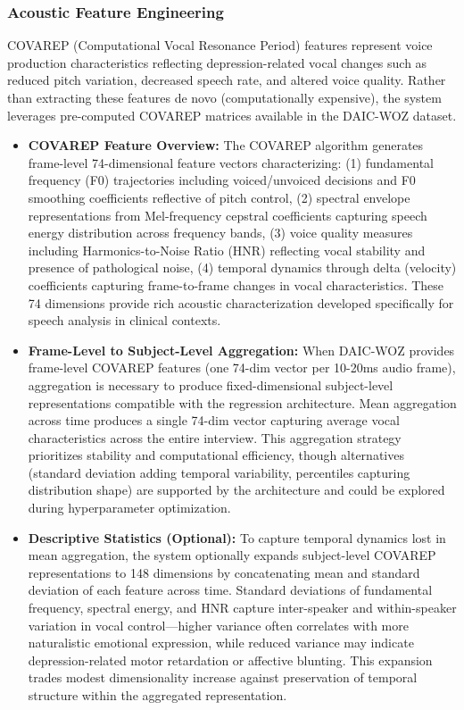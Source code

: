 \documentclass[12pt]{article}
\begin{document}
	\subsubsection{Acoustic Feature Engineering}

	COVAREP (Computational Vocal Resonance Period) features represent voice production characteristics reflecting depression-related vocal changes such as reduced pitch variation, decreased speech rate, and altered voice quality. Rather than extracting these features de novo (computationally expensive), the system leverages pre-computed COVAREP matrices available in the DAIC-WOZ dataset.

	\begin{itemize}
		\item \textbf{COVAREP Feature Overview:} The COVAREP algorithm generates frame-level 74-dimensional feature vectors characterizing: (1) fundamental frequency (F0) trajectories including voiced/unvoiced decisions and F0 smoothing coefficients reflective of pitch control, (2) spectral envelope representations from Mel-frequency cepstral coefficients capturing speech energy distribution across frequency bands, (3) voice quality measures including Harmonics-to-Noise Ratio (HNR) reflecting vocal stability and presence of pathological noise, (4) temporal dynamics through delta (velocity) coefficients capturing frame-to-frame changes in vocal characteristics. These 74 dimensions provide rich acoustic characterization developed specifically for speech analysis in clinical contexts.

		\item \textbf{Frame-Level to Subject-Level Aggregation:} When DAIC-WOZ provides frame-level COVAREP features (one 74-dim vector per 10-20ms audio frame), aggregation is necessary to produce fixed-dimensional subject-level representations compatible with the regression architecture. Mean aggregation across time produces a single 74-dim vector capturing average vocal characteristics across the entire interview. This aggregation strategy prioritizes stability and computational efficiency, though alternatives (standard deviation adding temporal variability, percentiles capturing distribution shape) are supported by the architecture and could be explored during hyperparameter optimization.

		\item \textbf{Descriptive Statistics (Optional):} To capture temporal dynamics lost in mean aggregation, the system optionally expands subject-level COVAREP representations to 148 dimensions by concatenating mean and standard deviation of each feature across time. Standard deviations of fundamental frequency, spectral energy, and HNR capture inter-speaker and within-speaker variation in vocal control—higher variance often correlates with more naturalistic emotional expression, while reduced variance may indicate depression-related motor retardation or affective blunting. This expansion trades modest dimensionality increase against preservation of temporal structure within the aggregated representation.
	\end{itemize}
\end{document}
